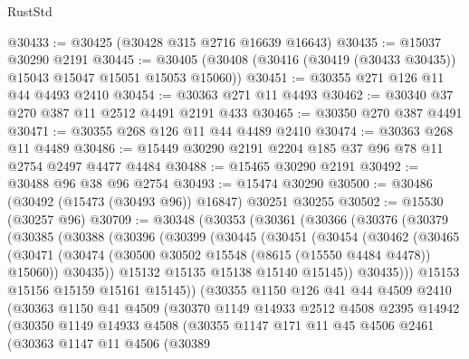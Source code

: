 \begin{lexlean}{RustStd}
\begin{coremodule}
@30433 := @30425 (@30428 @315 @2716 @16639 @16643)
@30435 := @15037 @30290 @2191
@30445 := @30405 (@30408 (@30416 (@30419 (@30433 @30435)) @15043 @15047 @15051 @15053 @15060))
@30451 := @30355 @271 @126 @11 @44 @4493 @2410
@30454 := @30363 @271 @11 @4493
@30462 := @30340 @37 @270 @387 @11 @2512 @4491 @2191 @433
@30465 := @30350 @270 @387 @4491
@30471 := @30355 @268 @126 @11 @44 @4489 @2410
@30474 := @30363 @268 @11 @4489
@30486 := @15449 @30290 @2191 @2204 @185 @37 @96 @78 @11 @2754 @2497 @4477 @4484
@30488 := @15465 @30290 @2191
@30492 := @30488 @96 @38 @96 @2754
@30493 := @15474 @30290
@30500 := @30486 (@30492 (@15473 (@30493 @96)) @16847) @30251 @30255
@30502 := @15530 (@30257 @96)
@30709 := @30348
    (@30353
      (@30361
        (@30366
          (@30376
            (@30379
              (@30385
                (@30388
                  (@30396
                    (@30399
                      (@30445
                        (@30451
                          (@30454
                            (@30462
                              (@30465
                                (@30471
                                  (@30474
                                    (@30500 @30502 @15548 (@8615 (@15550 @4484 @4478)) @15060))
                                  @30435))
                              @15132
                              @15135
                              @15138
                              @15140
                              @15145))
                          @30435)))
                    @15153
                    @15156
                    @15159
                    @15161
                    @15145))
                (@30355
                  @1150
                  @126
                  @41
                  @44
                  @4509
                  @2410
                  (@30363
                    @1150
                    @41
                    @4509
                    (@30370
                      @1149
                      @14933
                      @2512
                      @4508
                      @2395
                      @14942
                      (@30350
                        @1149
                        @14933
                        @4508
                        (@30355
                          @1147
                          @171
                          @11
                          @45
                          @4506
                          @2461
                          (@30363
                            @1147
                            @11
                            @4506
                            (@30389

\end{coremodule}
\end{lexlean}
